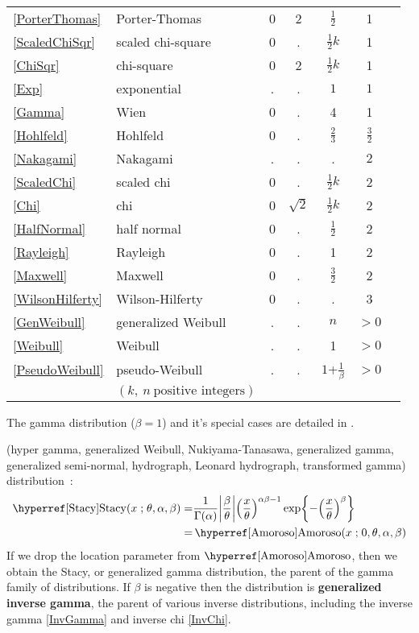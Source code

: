 \begin{table*}[p]
\begin{center}
{\begin{tabular}{llccccl}
\eqref{PorterThomas} & Porter-Thomas & 0 & 2 & $\tfrac{1}{2}$ & 1 \\
\eqref{ScaledChiSqr} & scaled chi-square & 0 & . & $\tfrac{1}{2}k$ & 1 \\
\eqref{ChiSqr} & chi-square & 0 & 2 & $\tfrac{1}{2}k$ & 1 \\
\eqref{Exp} & exponential & . & . & $1$ & $1$ \\
\eqref{Gamma} & Wien & 0 & . & 4& 1 \\
\eqref{Hohlfeld} & Hohlfeld & 0 & . & $\tfrac{2}{3}$ & $\tfrac{3}{2}$ \\
\eqref{Nakagami} & Nakagami & . & . & . & $2$ \\
\eqref{ScaledChi} &scaled chi& 0 & . & $\tfrac{1}{2}k$  & 2  \\
\eqref{Chi} & chi & 0 & $\sqrt{2}$ & $\tfrac{1}{2}k$ & 2 \\
\eqref{HalfNormal} & half normal & 0 & . & $\tfrac{1}{2}$ & 2 & \\  
\eqref{Rayleigh} & Rayleigh & 0 & . & 1 & 2  \\
\eqref{Maxwell} & Maxwell& 0 & . & $\frac{3}{2}$  & 2  \\
\eqref{WilsonHilferty} &Wilson-Hilferty& 0 & . & .  & 3  \\
\eqref{GenWeibull} & generalized Weibull  & . & . & $n$ & $>\!\!0$  \\
\eqref{Weibull} & Weibull & . & . & 1 &  $>\!\!0$  \\
\eqref{PseudoWeibull} & pseudo-Weibull & . & . & $1$+$\tfrac{1}{\beta}$ &  $>\!\!0$
 \\
  & $(k,\ n\ \text{positive integers})$
 \end{tabular} 
}
\end{center}
\end{table*}




The gamma distribution ($\beta=1$) and it's special cases are detailed in .

 (hyper gamma, generalized Weibull, Nukiyama-Tanasawa, generalized gamma, generalized semi-normal, hydrograph, Leonard hydrograph, transformed gamma)  distribution~\cite{Stacy1962,Dadpay2007}:
\begin{align}
\label{Stacy}
\opr{Stacy}(x \given \theta, \alpha, \beta) 
=& \frac{1}{\Gamma(\alpha)} \Left|\frac{\beta}{\theta}\Right| \Left(\frac{x}{\theta}\Right)^{\alpha\beta-1} 
\exp \Left\{ -\Left(\frac{x}{\theta}\Right)^{\beta} \Right\} \checked
\\=&  \opr{Amoroso}(x\given  0, \theta, \alpha, \beta) \notag \checked
\end{align}
If we drop the location parameter from $\opr{Amoroso}$, then we obtain the 
Stacy, or generalized gamma distribution, the parent of the gamma family of distributions.
If $\beta$ is negative then the distribution is  {\bf generalized inverse gamma}, the parent of various inverse distributions, including the inverse gamma \eqref{InvGamma} and inverse chi \eqref{InvChi}. 

